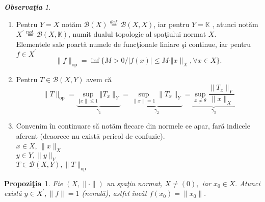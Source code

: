 \documentclass[ a4paper, 12pt]{report}
\newtheorem{prop}[theorem]{\bf Propozi\c tia }
\theoremstyle{remark}
\newtheorem{obs}{\bf Observa\c tia }[section]
\numberwithin{equation}{section}
\begin{document}
\begin{obs}
\begin{enumerate}
\item Pentru $Y = X$ not\u am $\mathcal{B}(X) \stackrel{def.}{=} \mathcal{B}(X,X)$, iar pentru $Y = \mathbb{K}$ , atunci not\u am $X^{'}\stackrel{not.}{=} \mathcal{B}(X,\mathbb{K})$, numit dualul topologic al spa\c tiului normat $X$.\\
Elementele sale poart\u a numele de func\c tionale liniare \c si continue, iar pentru $f \in X^{'}$ \[ \lVert f \rVert_{\mbox{op}} = \inf \{ M >0 / \lvert f(x) \rvert \leq M \cdot \Vert x \rVert_{X}, \forall x \in X\} .\]
\item Pentru $T \in \mathcal{B}(X,Y)$ avem c\u a
\[ \lVert  T \rVert_{\mbox{op}} = \underbrace{\sup\limits_{\Vert x \rVert \leq 1} \Vert T_x \rVert_{Y}}_{\gamma_1} = \underbrace{\sup\limits_{\lVert x \rVert = 1} \lVert T_x \rVert_{Y}}_{\gamma_2} = \underbrace{\sup\limits_{x \neq \theta} \frac{\lVert T_x \rVert_{Y}}{\lVert x \rVert_{X}}}_{\gamma_3} \]
\item Convenim \^in continuare s\u a not\u am fiecare din normele ce apar, far\u a indicele aferent (deaorece nu exist\u a pericol de confuzie).\\
$x \in X$, $\lVert x \rVert_{X}$\\
$y \in Y, \lVert y \rVert_{Y}$\\
$T \in \mathcal{B}(X,Y), \lVert T \rVert_{\mbox{op}}$
\end{enumerate}
\end{obs}
\begin{prop}
Fie $(X, \lVert \cdot \rVert)$ un spa\c tiu normat, $X \neq (0),$ iar $x_0 \in X.$ Atunci exist\u a $y \in X^{'}, \lVert f \rVert = 1$ (nenul\u a), astfel \^inc\^at $f(x_0) = \lVert x_0 \rVert.$
\end{prop}
\end{document}
